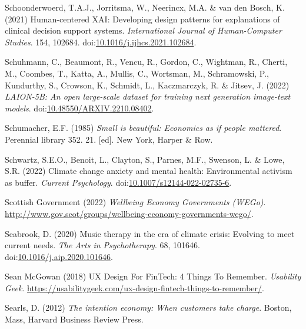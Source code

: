 \documentclass[
  letterpaper,
  DIV=11,
  numbers=noendperiod]{scrartcl}
\newlength{\cslhangindent}
\newenvironment{CSLReferences}[2] %
 {\begin{list}{}{%
  \setlength{\itemindent}{0pt}
  \setlength{\leftmargin}{0pt}
  \setlength{\parsep}{0pt}
  \ifodd #1
   \setlength{\leftmargin}{\cslhangindent}
   \setlength{\itemindent}{-1\cslhangindent}
  \fi
  \setlength{\itemsep}{#2\baselineskip}}}
 {\end{list}}
\begin{document}
\begin{CSLReferences}{0}{1}
Schoonderwoerd, T.A.J., Jorritsma, W., Neerincx, M.A. \& van den Bosch,
K. (2021) Human-centered {XAI}: {Developing} design patterns for
explanations of clinical decision support systems. \emph{International
Journal of Human-Computer Studies}. 154, 102684.
doi:\href{https://doi.org/10.1016/j.ijhcs.2021.102684}{10.1016/j.ijhcs.2021.102684}.

Schuhmann, C., Beaumont, R., Vencu, R., Gordon, C., Wightman, R.,
Cherti, M., Coombes, T., Katta, A., Mullis, C., Wortsman, M.,
Schramowski, P., Kundurthy, S., Crowson, K., Schmidt, L., Kaczmarczyk,
R. \& Jitsev, J. (2022) \emph{{LAION-5B}: {An} open large-scale dataset
for training next generation image-text models}.
doi:\href{https://doi.org/10.48550/ARXIV.2210.08402}{10.48550/ARXIV.2210.08402}.

Schumacher, E.F. (1985) \emph{Small is beautiful: Economics as if people
mattered}. Perennial library 352. 21. {[}ed{]}. New York, Harper \& Row.

Schwartz, S.E.O., Benoit, L., Clayton, S., Parnes, M.F., Swenson, L. \&
Lowe, S.R. (2022) Climate change anxiety and mental health:
{Environmental} activism as buffer. \emph{Current Psychology}.
doi:\href{https://doi.org/10.1007/s12144-022-02735-6}{10.1007/s12144-022-02735-6}.

Scottish Government (2022) \emph{Wellbeing {Economy Governments}
({WEGo})}.
\url{http://www.gov.scot/groups/wellbeing-economy-governments-wego/}.

Seabrook, D. (2020) Music therapy in the era of climate crisis:
{Evolving} to meet current needs. \emph{The Arts in Psychotherapy}. 68,
101646.
doi:\href{https://doi.org/10.1016/j.aip.2020.101646}{10.1016/j.aip.2020.101646}.

Sean McGowan (2018) {UX Design For FinTech}: 4 {Things To Remember}.
\emph{Usability Geek}.
\url{https://usabilitygeek.com/ux-design-fintech-things-to-remember/}.

Searls, D. (2012) \emph{The intention economy: When customers take
charge}. Boston, Mass, Harvard Business Review Press.


\end{CSLReferences}
\end{document}
